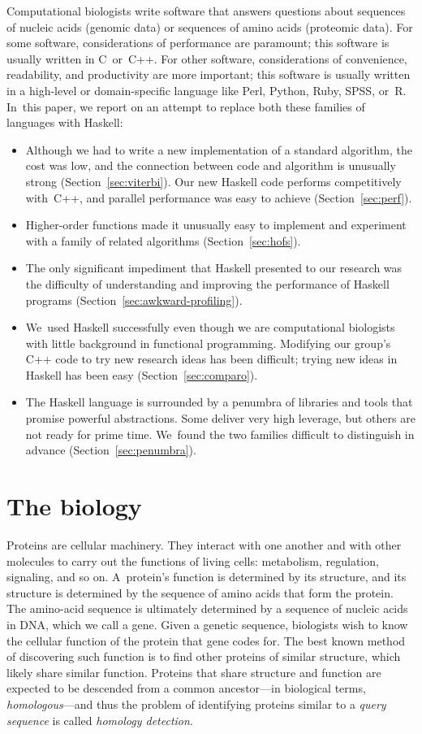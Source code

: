 \documentclass[preprint,nonatbib,blockstyle,nocopyrightspace,times]{sigplanconf}
\newcommand\secref[1]{Section~\ref{sec:#1}}
\begin{document}
Computational biologists write software that answers questions about 
sequences of nucleic acids (genomic data) or sequences of amino 
acids (proteomic data). 
For some software, considerations of performance are paramount; this
software is usually written in C~or~C++. 
For other software, considerations of convenience, readability, and
productivity are more important;
this software is usually written in a high-level
or domain-specific language like
Perl, Python, Ruby, SPSS, or~R.
In~this paper, we report on an attempt to replace both these families
of languages with Haskell: 
\begin{itemize}
\item
Although we had to write a new implementation of a standard
algorithm, the cost was low, and the connection between code and
algorithm is unusually strong (\secref{viterbi}).
Our new Haskell code performs competitively with~C++,
and parallel performance was easy to achieve
(\secref{perf}). 
\item
Higher-order functions made it unusually easy to
implement and experiment with a family of related algorithms
(\secref{hofs}).
\item
The only significant impediment that Haskell presented to our
research was the difficulty of understanding and improving the
performance of Haskell programs (\secref{awkward-profiling}).
\item
We~used Haskell successfully even though we are computational
biologists with little background in functional programming.
Modifying our group's C++ code to try new research ideas has been
difficult;
trying new ideas in Haskell has been easy
(\secref{comparo}).
\item
The Haskell language is surrounded by a penumbra of libraries and tools that
promise powerful abstractions.
Some deliver very high leverage, but others are not ready for prime
time.
We~found the two families difficult to distinguish in advance (\secref{penumbra}).
\end{itemize}




\section{The biology}

Proteins are cellular machinery. They interact with one another and with other 
molecules to carry out the functions of living cells: metabolism, regulation, 
signaling, and so on.
A~protein's function is determined by its structure, 
and its structure is determined by the sequence of amino acids that
form the protein.
The amino-acid sequence is ultimately determined by a sequence of
nucleic acids in DNA, which we call a gene.
Given a genetic sequence, biologists wish to know the cellular
function of the protein that gene codes for.
The best known method of discovering such function is
to find other proteins of 
similar structure, which likely share similar function.
Proteins that share structure and function are expected to be
descended from a common ancestor---in biological terms, \emph{homologous}---and
thus
the problem of identifying proteins similar to a \textit{query sequence} is called 
\textit{homology detection}.
\end{document}
